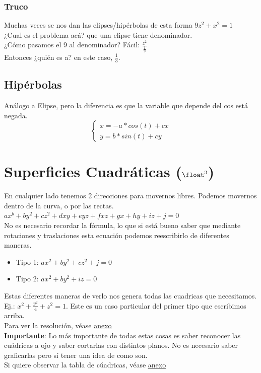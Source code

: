 \documentclass[10pt,a4paper]{article}
\begin{document}
\subsubsection{Truco}
Muchas veces se nos dan las elipses/hipérbolas de esta forma $9z^{2} + x^{2} = 1$ \\
¿Cual es el problema acá? que una elipse tiene denominador. \\
¿Cómo pasamos el 9 al denominador? Fácil: $\frac{z^{2}}{\frac{1}{9}}$ \\
Entonces ¿quién es a? en este caso, $\frac{1}{3}$. 
\subsection*{Hipérbolas}
Análogo a Elipse, pero la diferencia es que la variable que depende del cos está negada. 
\[
\begin{cases} 
x = -a * cos(t) + cx \\
y = b * sin(t) + cy
\end{cases}
\]
\section*{Superficies Cuadráticas ($\float^{3}$)}
En cualquier lado tenemos 2 direcciones para movernos libres. Podemos movernos dentro de la curva, o por las rectas. \\
$ax^{b} + by^{2} + cz^{2} + dxy + eyz + fxz + gx + hy + iz + j = 0$ \\
No es necesario recordar la fórmula, lo que si está bueno saber que mediante rotaciones y traslaciones esta ecuación podemos reescribirlo de diferentes maneras. 
\begin{itemize}
    \item Tipo 1: $ax^{2} + by^{2} + cz^{2} + j = 0$
    \item Tipo 2: $ax^{2} + by^{2} + iz = 0$
\end{itemize}
Estas diferentes maneras de verlo nos genera todas las cuadricas que necesitamos. \\
Ej.: $x^{2} + \frac{y^{2}}{4} + z^{2} = 1$. Este es un caso particular del primer tipo que escribimos arriba. \\
Para ver la resolución, véase \hyperref[subsec:trazas_superficies]{\underline{anexo}} \\
\textbf{Importante}: Lo más importante de todas estas cosas es saber reconocer las cuádricas a ojo y saber cortarlas con distintos planos. No es necesario saber graficarlas pero sí tener una idea de como son. \\
Si quiere observar la tabla de cúadricas, véase \hyperref[subsec:tabla_cuadricas]{\underline{anexo}}
\end{document}

